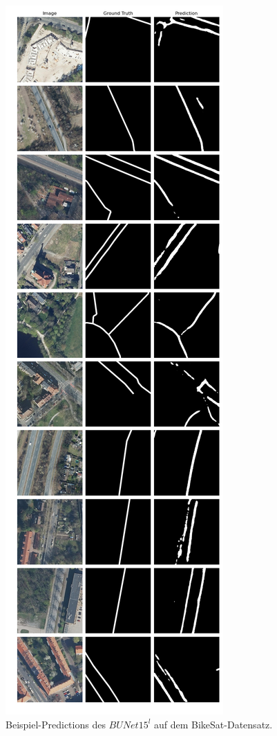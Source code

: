 \begin{figure}
	\centering
	\includegraphics[width=.41\textwidth]{Bilder/Samples-BikeSat/bunet15-l.png} 
	\caption{Beispiel-Predictions des $BUNet15^l$ auf dem BikeSat-Datensatz.}
	\label{fig:bikesat-samples-bunet15-l}
\end{figure}

